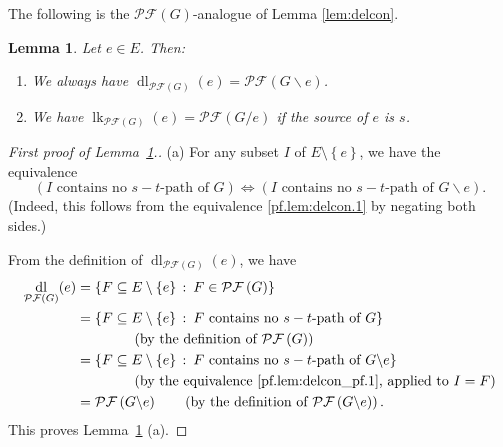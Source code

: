 \documentclass[12pt]{amsart}
\newtheorem{lemma}[theorem]{Lemma}
\theoremstyle{definition}
\newcommand{\with}{\,\colon\,}
\DeclareMathOperator{\lk}{lk}
\DeclareMathOperator{\dl}{dl}
\newcommand{\set}[1]{\left\{ #1 \right\}}
\newcommand{\tup}[1]{\left( #1 \right)}
\newcommand{\Pf}[1]{\mathcal{PF}\left(#1\right)}
\begin{document}
The following is the $\Pf{G}$-analogue of Lemma \ref{lem:delcon}.

\begin{lemma}\label{lem:delcon_pf}
	Let $e \in E$. Then:
	\begin{enumerate}
		\item[(a)] We always have $\dl_{\Pf{G}}(e) = \Pf{G \backslash e}$.
		\item[(b)] We have $\lk_{\Pf{G}}(e) = \Pf{G / e}$ if the source of $e$ is $s$.
	\end{enumerate}
\end{lemma}

\begin{proof}[First proof of Lemma~\ref{lem:delcon_pf}.]
    (a) For any subset $I$ of $E \setminus \set{e}$, we have the equivalence
    \begin{equation}
    \label{pf.lem:delcon_pf.1}
                        \tup{I \text{ contains no $s-t$-path of $G$}} 
    \Longleftrightarrow  \tup{I \text{ contains no $s-t$-path of $G \backslash e$}} .
    \end{equation}
    (Indeed, this follows from the equivalence \eqref{pf.lem:delcon.1} by negating both sides.)
    
    From the definition of $\dl_{\Pf{G}}(e)$, we have
    \begin{align*}
    \dl_{\Pf{G}}(e)
    &= \set{F \subseteq E \setminus \set{e} \with F \in \Pf{G}} \\
    &= \set{F \subseteq E \setminus \set{e} \with F \text{ contains no $s-t$-path of $G$}} \\
    & \qquad\qquad \tup{\text{by the definition of $\Pf{G}$}} \\
    &= \set{F \subseteq E \setminus \set{e} \with F \text{ contains no $s-t$-path of $G \backslash e$}} \\
    & \qquad\qquad \tup{\text{by the equivalence \eqref{pf.lem:delcon_pf.1}, applied to $I=F$}} \\
    &= \Pf{G \backslash e}
     \qquad \tup{\text{by the definition of $\Pf{G \backslash e}$}} .
    \end{align*}
    This proves Lemma~\ref{lem:delcon_pf} (a).
    

\end{proof}
\end{document}
